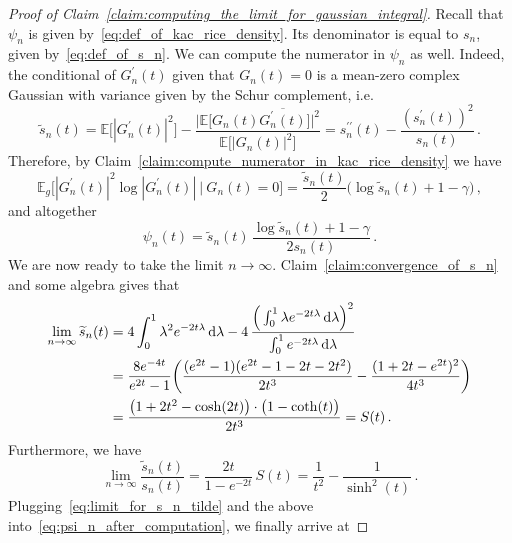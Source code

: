 \documentclass[11pt]{amsart}
\theoremstyle{remark}
\theoremstyle{definition}
\def\la{{\lambda}}
\newcommand{\bE}{\mathbb E}
\begin{document}
    \begin{proof}[Proof of Claim~\ref{claim:computing_the_limit_for_gaussian_integral}]
        Recall that $\psi_n$ is given by~\eqref{eq:def_of_kac_rice_density}. Its denominator is equal to $s_n$, given by~\eqref{eq:def_of_s_n}. We can compute the numerator in $\psi_n$ as well. Indeed, the conditional of $G_n^\prime(t)$ given that $G_n(t) = 0$ is a mean-zero complex Gaussian with variance given by the Schur complement, i.e.
        \begin{equation*}
            \widetilde{s}_n(t) = \bE\big[|G_n^\prime(t)|^2\big] - \frac{\Big|\bE\big[G_n(t) \overline{G_n^\prime(t)}\big]\Big|^2}{\bE\big[|G_n(t)|^2\big]} = s_n^{\prime\prime}(t) - \frac{(s_n^\prime(t))^2}{s_n(t)} \, .
        \end{equation*}
        Therefore, by Claim~\ref{claim:compute_numerator_in_kac_rice_density} we have 
        \[
        \bE_g\Big[ |G_n^\prime(t)|^2 \log|G_n^\prime(t)| \  \big| \  G_n(t)=0\Big] = \frac{\widetilde{s}_n(t)}{2}\Big(\log \widetilde{s}_n(t) + 1 - \gamma \Big) \, ,
        \]
        and altogether
        \begin{equation}
        \label{eq:psi_n_after_computation}
            \psi_n(t) = \widetilde{s}_n(t)\, \frac{\log \widetilde{s}_n(t) + 1 - \gamma}{2s_n(t)} \, .
        \end{equation}
        We are now ready to take the limit $n\to \infty$. Claim~\ref{claim:convergence_of_s_n} and some algebra gives that
        \begin{align}
            \label{eq:limit_for_s_n_tilde}
            \nonumber
            \lim_{n\to\infty} \widetilde{s}_n(t) &= 4\int_0^1 \la^2 e^{-2t\la} \, {\rm d}\la - 4 \, \frac{\Big(\int_0^1 \la e^{-2t\la} \, {\rm d}\la\Big)^2}{\int_0^1 e^{-2t\la} \, {\rm d}\la} \\ \nonumber & = \frac{8e^{-4t}}{e^{2t}-1}\bigg( \frac{(e^{2t}-
            1)(e^{2t}-1-2t-2t^2)}{2t^3}  -  \frac{(1+2t-e^{2t})^2}{4t^3}\bigg) \\ & = \frac{\big(1+2t^2-\cosh(2t)\big)\cdot \big( 1-\coth(t)\big)}{2t^3} = S(t) \, .
        \end{align}
        Furthermore, we have 
        \begin{equation*}
        \lim_{n\to\infty} \frac{\widetilde{s}_n(t)}{s_n(t)} = \frac{2t}{1-e^{-2t}} \, S(t) = \frac{1}{t^2} - \frac{1}{\sinh^2(t)} \, .
        \end{equation*}
         Plugging~\eqref{eq:limit_for_s_n_tilde} and the above into~\eqref{eq:psi_n_after_computation}, we finally arrive at

\end{proof}
\end{document}
